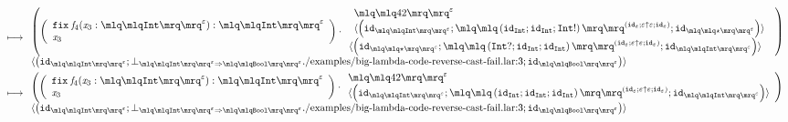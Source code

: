 \documentclass{article}
\begin{document}
\begin{align*}
\longmapsto &\;\begin{array}{l}\left(\left(\begin{array}{l} \mathtt{fix}\; \mathit{f}_{4}(\mathit{x}_{3}:\quot{\mathtt{Int}}^{\varepsilon}): \quot{\mathtt{Int}}^{\varepsilon}\\\mathit{x}_{3}\end{array}\right)\cdot \begin{array}{l}\begin{array}{l}\quot{42}^{\varepsilon}\\\langle\left(\mathtt{id}_{\quot{\mathtt{Int}}^{\varepsilon}};\quot{\left(\mathtt{id}_{\mathtt{Int}};\mathtt{id}_{\mathtt{Int}};\mathtt{Int}!\right)}^{\left(\mathtt{id}_{\varepsilon};\varepsilon \uparrow \varepsilon;\mathtt{id}_{\varepsilon}\right)};\mathtt{id}_{\quot{\star}^{\varepsilon}}\right)\rangle\end{array}\\\langle\left(\mathtt{id}_{\quot{\star}^{\varepsilon}};\quot{\left(\mathtt{Int}?;\mathtt{id}_{\mathtt{Int}};\mathtt{id}_{\mathtt{Int}}\right)}^{\left(\mathtt{id}_{\varepsilon};\varepsilon \uparrow \varepsilon;\mathtt{id}_{\varepsilon}\right)};\mathtt{id}_{\quot{\mathtt{Int}}^{\varepsilon}}\right)\rangle\end{array}\right)\\\langle\left(\mathtt{id}_{\quot{\mathtt{Int}}^{\varepsilon}};\bot_{\quot{\mathtt{Int}}^{\varepsilon}\Rightarrow\quot{\mathtt{Bool}}^{\varepsilon}}\text{./examples/big-lambda-code-reverse-cast-fail.lar:3};\mathtt{id}_{\quot{\mathtt{Bool}}^{\varepsilon}}\right)\rangle\end{array}\\ 
\longmapsto &\;\begin{array}{l}\left(\left(\begin{array}{l} \mathtt{fix}\; \mathit{f}_{4}(\mathit{x}_{3}:\quot{\mathtt{Int}}^{\varepsilon}): \quot{\mathtt{Int}}^{\varepsilon}\\\mathit{x}_{3}\end{array}\right)\cdot \begin{array}{l}\quot{42}^{\varepsilon}\\\langle\left(\mathtt{id}_{\quot{\mathtt{Int}}^{\varepsilon}};\quot{\left(\mathtt{id}_{\mathtt{Int}};\mathtt{id}_{\mathtt{Int}};\mathtt{id}_{\mathtt{Int}}\right)}^{\left(\mathtt{id}_{\varepsilon};\varepsilon \uparrow \varepsilon;\mathtt{id}_{\varepsilon}\right)};\mathtt{id}_{\quot{\mathtt{Int}}^{\varepsilon}}\right)\rangle\end{array}\right)\\\langle\left(\mathtt{id}_{\quot{\mathtt{Int}}^{\varepsilon}};\bot_{\quot{\mathtt{Int}}^{\varepsilon}\Rightarrow\quot{\mathtt{Bool}}^{\varepsilon}}\text{./examples/big-lambda-code-reverse-cast-fail.lar:3};\mathtt{id}_{\quot{\mathtt{Bool}}^{\varepsilon}}\right)\rangle\end{array}\\ 

\end{align*}
\end{document}
